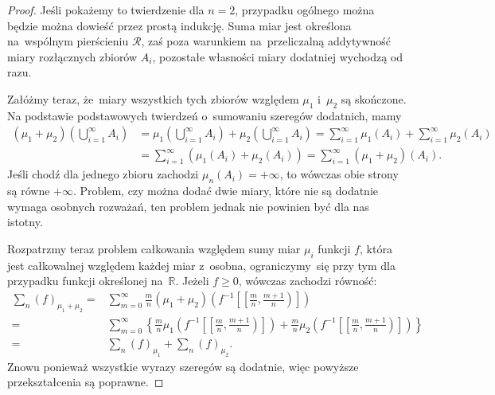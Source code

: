 \documentclass[a4paper,11pt]{article}
\newcommand{\fr}{\frac}
\newcommand{\tfr}{\tfrac}
\newcommand{\mb}{\mathbb}
\newcommand{\mc}{\mathcal}
\newcommand{\R}{\mb{R}}
\newcommand{\Rc}{\mc{R}}
\newcommand{\Sum}{\sum\limits}
\begin{document}
\begin{proof}
  Jeśli pokażemy to twierdzenie dla $n = 2$, przypadku ogólnego można
  będzie można dowieść przez prostą indukcję. Suma miar jest określona
  na~wspólnym pierścieniu $\Rc$, zaś poza warunkiem na~przeliczalną
  addytywność miary rozłącznych zbiorów $A_{ i }$, pozostałe własności
  miary dodatniej wychodzą od razu.

  Załóżmy teraz, że~miary wszystkich tych zbiorów względem $\mu_{ 1 }$
  i~$\mu_{ 2 }$ są skończone. Na podstawie podstawowych twierdzeń
  o~sumowaniu szeregów dodatnich, mamy
  \begin{equation*}
    \begin{split}
      (\mu_{ 1 } + \mu_{ 2 })\left( \bigcup_{ i = 1 }^{ \infty } A_{ i
        } \right) &= \mu_{ 1 }\left( \bigcup_{ i = 1 }^{ \infty } A_{
          i } \right) + \mu_{ 2 }\left( \bigcup_{ i = 1 }^{ \infty }
        A_{ i } \right) = \sum_{ i = 1 }^{ \infty } \mu_{ 1 }( A_{ i }
      )
      + \sum_{ i = 1 }^{ \infty } \mu_{ 2 }( A_{ i } ) \\
      &= \sum_{ i = 1 }^{ \infty } ( \mu_{ 1 }( A_{ i } ) + \mu_{ 2 }(
      A_{ i } ) ) = \sum_{ i = 1 }^{ \infty } ( \mu_{ 1 } + \mu_{ 2 }
      )( A_{ i } ).
    \end{split}
  \end{equation*}
  Jeśli chodź dla jednego zbioru zachodzi
  $\mu_{ n }( A_{ i } ) = +\infty$, to wówczas obie strony są równe
  $+\infty$. Problem, czy można dodać dwie miary, które nie są
  dodatnie wymaga osobnych rozważań, ten problem jednak nie powinien
  być dla nas istotny.

  Rozpatrzmy teraz problem całkowania względem sumy miar $\mu_{ i }$
  funkcji $f$, która jest całkowalnej względem każdej miar z~osobna,
  ograniczymy~się przy tym dla przypadku funkcji określonej na~$\R$.
  Jeżeli $f \geq 0$, wówczas zachodzi równość:
  \begin{equation}
    \label{eq:RSI2}
    \begin{split}
      \sum_{ n }( f )_{ \mu_{ 1 } + \mu_{ 2 } } =& \Sum_{ m = 0 }^{
        \infty } \fr{ m }{ n } ( \mu_{ 1 } + \mu_{ 2 } ) \left( f^{ -1
        }\left[ \left[ \tfr{ m }{ n }, \tfr{ m + 1 }{ n } \right)
        \right] \right) \\
      =& \Sum_{ m = 0 }^{ \infty } \left\{ \fr{ m }{ n } \mu_{ 1
        }\left( f^{ -1 }\left[ \left[ \tfr{ m }{ n }, \tfr{ m + 1 }{ n
              } \right) \right] \right) \right. + \left. \fr{ m }{ n }
        \mu_{ 2 }\left( f^{ -1 }\left[ \left[ \tfr{ m }{ n },
              \tfr{ m + 1 }{ n } \right) \right] \right) \right\} \\
      =& \Sum_{ n }( f )_{ \mu_{ 1 } } + \Sum_{ n }( f )_{ \mu_{ 2 }
      }.
    \end{split}
  \end{equation}
  Znowu ponieważ wszystkie wyrazy szeregów są dodatnie, więc powyższe
  przekształcenia są poprawne.


\end{proof}
\end{document}
